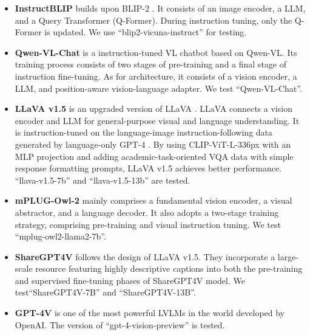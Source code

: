 \begin{itemize}
    \item \textbf{InstructBLIP} \cite{dai2023instructblip} builds upon BLIP-2 \cite{li2023blip}. 
    It consists of an image encoder, a LLM, and a Query Transformer (Q-Former). 
    During instruction tuning, only the Q-Former is updated. 
    We use ``blip2-vicuna-instruct'' for testing.
    \item \textbf{Qwen-VL-Chat} \cite{bai2023qwenvl} is a instruction-tuned VL chatbot based on Qwen-VL. 
    Its training process consists of two stages of pre-training and a final stage of instruction fine-tuning. 
    As for architecture, it consists of a vision encoder, a LLM, and position-aware vision-language adapter. We test ``Qwen-VL-Chat''.
    \item \textbf{LLaVA v1.5} \citep{liu2023improved} is an upgraded version of LLaVA  \cite{liu2023llava}. 
    LLaVA connects a vision encoder and LLM for general-purpose visual and language understanding. 
    It is instruction-tuned on the language-image instruction-following data generated by language-only GPT-4 \cite{openai2023gpt4}. 
    By using CLIP-ViT-L-336px with an MLP projection and adding academic-task-oriented VQA data with simple response formatting prompts, LLaVA v1.5 achieves better performance. 
    ``llava-v1.5-7b'' and ``llava-v1.5-13b'' are tested.
    \item \textbf{mPLUG-Owl-2} \cite{ye2023mplug} mainly comprises a fundamental vision encoder, a visual abstractor, and a language decoder. 
    It also adopts a two-stage training strategy, comprising pre-training and visual instruction tuning. 
    We test ``mplug-owl2-llama2-7b''. 
    \item \textbf{ShareGPT4V} \cite{chen2023sharegpt4v} follows the design of LLaVA v1.5.
     They incorporate a large-scale resource featuring highly descriptive captions into both the pre-training and supervised fine-tuning phases of ShareGPT4V model.
    We test``ShareGPT4V-7B'' and ``ShareGPT4V-13B''.
    \item \textbf{GPT-4V} \citep{openai2023gpt4} is one of the most powerful LVLMs in the world developed by OpenAI. The version of ``gpt-4-vision-preview'' is tested.
\end{itemize}

